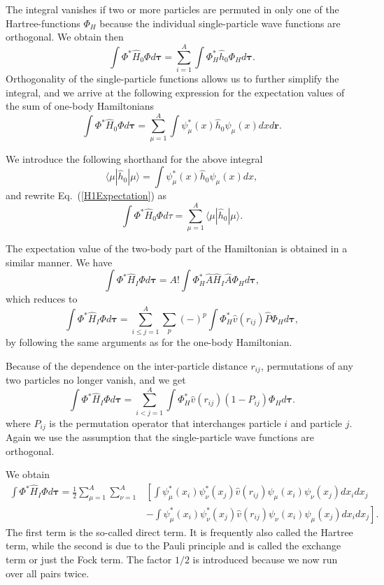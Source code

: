 \documentclass[%
oneside,                 %
final,                   %
10pt]{article}
\begin{document}
The integral vanishes if two or more particles are permuted in only one
of the Hartree-functions $\Phi_H$ because the individual single-particle wave functions are
orthogonal. We obtain then
\[
  \int \Phi^*\hat{H}_0\Phi  d\mathbf{\tau}= \sum_{i=1}^A \int \Phi_H^*\hat{h}_0\Phi_H  d\mathbf{\tau}.
\]
Orthogonality of the single-particle functions allows us to further simplify the integral, and we
arrive at the following expression for the expectation values of the
sum of one-body Hamiltonians 
\begin{equation}
  \int \Phi^*\hat{H}_0\Phi  d\mathbf{\tau}
  = \sum_{\mu=1}^A \int \psi_{\mu}^*(x)\hat{h}_0\psi_{\mu}(x)dx
  d\mathbf{r}.
  \label{H1Expectation}
\end{equation}



We introduce the following shorthand for the above integral
\[
\langle \mu | \hat{h}_0 | \mu \rangle = \int \psi_{\mu}^*(x)\hat{h}_0\psi_{\mu}(x)dx,
\]
and rewrite Eq.~(\ref{H1Expectation}) as
\begin{equation}
  \int \Phi^*\hat{H}_0\Phi  d\tau
  = \sum_{\mu=1}^A \langle \mu | \hat{h}_0 | \mu \rangle.
  \label{H1Expectation1}
\end{equation}



The expectation value of the two-body part of the Hamiltonian is obtained in a
similar manner. We have
\[
  \int \Phi^*\hat{H}_I\Phi d\mathbf{\tau} 
  = A! \int \Phi_H^*\hat{A}\hat{H}_I\hat{A}\Phi_H d\mathbf{\tau},
\]
which reduces to
\[
 \int \Phi^*\hat{H}_I\Phi d\mathbf{\tau} 
  = \sum_{i\le j=1}^A \sum_{p} (-)^p\int 
  \Phi_H^*\hat{v}(r_{ij})\hat{P}\Phi_H d\mathbf{\tau},
\]
by following the same arguments as for the one-body
Hamiltonian. 



Because of the dependence on the inter-particle distance $r_{ij}$,  permutations of
any two particles no longer vanish, and we get
\[
  \int \Phi^*\hat{H}_I\Phi d\mathbf{\tau} 
  = \sum_{i < j=1}^A \int  
  \Phi_H^*\hat{v}(r_{ij})(1-P_{ij})\Phi_H d\mathbf{\tau}.
\]
where $P_{ij}$ is the permutation operator that interchanges
particle $i$ and particle $j$. Again we use the assumption that the single-particle wave functions
are orthogonal. 





We obtain
\begin{align}
  \int \Phi^*\hat{H}_I\Phi d\mathbf{\tau} 
  = \frac{1}{2}\sum_{\mu=1}^A\sum_{\nu=1}^A
    &\left[ \int \psi_{\mu}^*(x_i)\psi_{\nu}^*(x_j)\hat{v}(r_{ij})\psi_{\mu}(x_i)\psi_{\nu}(x_j)
    dx_idx_j \right.\\
  &\left.
  - \int \psi_{\mu}^*(x_i)\psi_{\nu}^*(x_j)
  \hat{v}(r_{ij})\psi_{\nu}(x_i)\psi_{\mu}(x_j)
  dx_idx_j
  \right]. \label{H2Expectation}
\end{align}
The first term is the so-called direct term. It is frequently also called the  Hartree term, 
while the second is due to the Pauli principle and is called
the exchange term or just the Fock term.
The factor  $1/2$ is introduced because we now run over
all pairs twice. 
\end{document}
